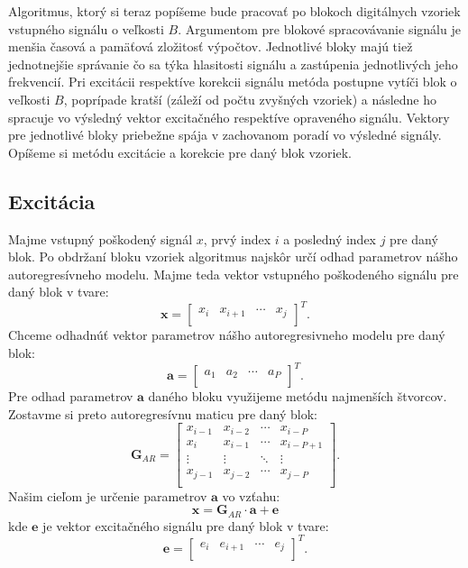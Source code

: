 Algoritmus, ktorý si teraz popíšeme bude pracovať po blokoch digitálnych vzoriek vstupného signálu o veľkosti $B$. Argumentom pre blokové spracovávanie signálu je menšia časová a pamäťová zložitosť výpočtov. Jednotlivé bloky majú tiež jednotnejšie správanie čo sa týka hlasitosti signálu a zastúpenia jednotlivých jeho frekvencií. Pri excitácii respektíve korekcii signálu metóda postupne vytíči blok o veľkosti $B$, poprípade kratší (záleží od počtu zvyšných vzoriek) a následne ho spracuje vo výsledný vektor excitačného respektíve opraveného signálu. Vektory pre jednotlivé bloky priebežne spája v zachovanom poradí vo výsledné signály. Opíšeme si metódu excitácie a korekcie pre daný blok vzoriek.

\subsection{Excitácia}
Majme vstupný poškodený signál $x$, prvý index $i$ a posledný index $j$ pre daný blok. Po obdržaní bloku vzoriek algoritmus najskôr určí odhad parametrov nášho autoregresívneho modelu. Majme teda vektor vstupného poškodeného signálu pre daný blok v tvare:
$$\mathbf{x}=\begin{bmatrix} 
  x_i & x_{i+1} & \cdots & x_j\\ 
\end{bmatrix}^T.$$ 
Chceme odhadnúť vektor parametrov nášho autoregresivneho modelu pre daný blok:
$$\mathbf{a}=\begin{bmatrix} 
  a_1 & a_2 & \cdots & a_P\\
\end{bmatrix}^T.$$ 
Pre odhad parametrov $\mathbf{a}$ daného bloku využijeme metódu najmenších štvorcov. Zostavme si preto autoregresívnu maticu pre daný blok:
$$\mathbf{G}_{AR}=\begin{bmatrix} 
  x_{i-1} & x_{i-2} & \cdots & x_{i-P}\\
  x_i & x_{i-1} & \cdots & x_{i-P+1}\\
  \vdots & \vdots & \ddots & \vdots\\
  x_{j-1} & x_{j-2} & \cdots & x_{j-P}\\
\end{bmatrix}.$$ 
Našim cieľom je určenie parametrov $\mathbf{a}$ vo vzťahu: 
$$\mathbf{x}=\mathbf{G}_{AR} \cdot \mathbf{a} + \mathbf{e}$$ 
kde $\mathbf{e}$ je vektor excitačného signálu pre daný blok v tvare:
$$\mathbf{e}=\begin{bmatrix} 
  e_i & e_{i+1} & \cdots & e_{j}\\
\end{bmatrix}^T.$$
